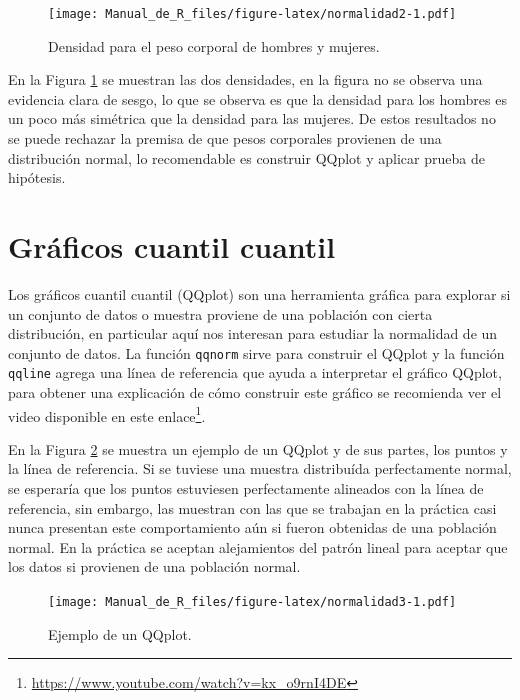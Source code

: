 \documentclass[10pt,]{krantz}
\renewcommand{\href}[2]{#2\footnote{\url{#1}}}
\begin{document}
\begin{figure}
\centering
\texttt{[image: Manual\_de\_R\_files/figure-latex/normalidad2-1.pdf]}
\caption{\label{fig:normalidad2}Densidad para el peso corporal de hombres y
mujeres.}
\end{figure}

En la Figura \ref{fig:normalidad2} se muestran las dos densidades, en la
figura no se observa una evidencia clara de sesgo, lo que se observa es
que la densidad para los hombres es un poco más simétrica que la
densidad para las mujeres. De estos resultados no se puede rechazar la
premisa de que pesos corporales provienen de una distribución normal, lo
recomendable es construir QQplot y aplicar prueba de hipótesis.

\section{\texorpdfstring{Gráficos cuantil cuantil 
}{Gráficos cuantil cuantil   }}\label{graficos-cuantil-cuantil}

Los gráficos cuantil cuantil (QQplot) son una herramienta gráfica para
explorar si un conjunto de datos o muestra proviene de una población con
cierta distribución, en particular aquí nos interesan para estudiar la
normalidad de un conjunto de datos. La función \texttt{qqnorm} sirve
para construir el QQplot y la función \texttt{qqline} agrega una línea
de referencia que ayuda a interpretar el gráfico QQplot, para obtener
una explicación de cómo construir este gráfico se recomienda ver el
video disponible en este
\href{https://www.youtube.com/watch?v=kx_o9rnI4DE}{enlace}.

En la Figura \ref{fig:normalidad3} se muestra un ejemplo de un QQplot y
de sus partes, los puntos y la línea de referencia. Si se tuviese una
muestra distribuída perfectamente normal, se esperaría que los puntos
estuviesen perfectamente alineados con la línea de referencia, sin
embargo, las muestran con las que se trabajan en la práctica casi nunca
presentan este comportamiento aún si fueron obtenidas de una población
normal. En la práctica se aceptan alejamientos del patrón lineal para
aceptar que los datos si provienen de una población normal.

\begin{figure}
\centering
\texttt{[image: Manual\_de\_R\_files/figure-latex/normalidad3-1.pdf]}
\caption{\label{fig:normalidad3}Ejemplo de un QQplot.}
\end{figure}
\end{document}
